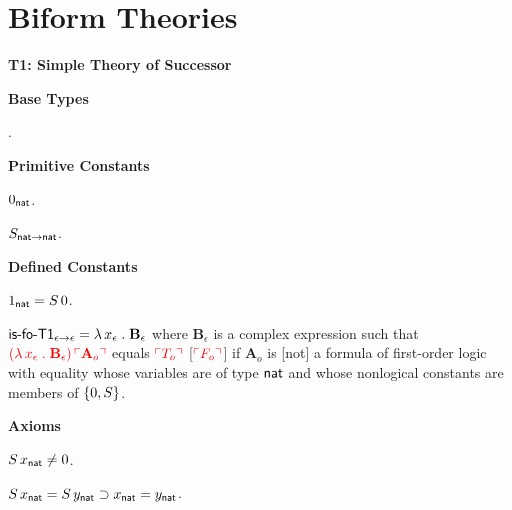 \documentclass[fleqn,11pt]{article}
\begin{document}
\ee
  

\section{Biform Theories}

\noindent
\textbf{T1: Simple Theory of Successor}

\bi

  \item[] \textbf{Base Types} 

  \be

    \item {}.

  \ee

  \item[] \textbf{Primitive Constants}

  \be

    \item $0_{\sf nat}$.

    \item $S_{{\sf nat} \rightarrow {\sf nat}}$.

  \ee

  \item[] \textbf{Defined Constants}

  \be

    \item $1_{\sf nat} = S \, 0$.

    \item $\mbox{\sf is-fo-T1}_{\epsilon \rightarrow \epsilon} = \lambda\,
      x_\epsilon \mathrel. \textbf{B}_\epsilon$ {\sglsp} where
      $\textbf{B}_\epsilon$ is a complex expression such that
      $\textcolor{red}{(\lambda\, x_\epsilon \mathrel. \textbf{B}_\epsilon) \,
      \ulcorner\textbf{A}_o\urcorner}$ equals $\textcolor{red}{\ulcorner T_o\urcorner}$
      [$\textcolor{red}{\ulcorner F_o\urcorner}$] if $\textbf{A}_o$ is [not] a formula of
      first-order logic with equality whose variables are of type
      $\mbox{\sf nat}$ and whose nonlogical constants are members of
      ${\{ 0,S \}}$.

  \ee

  \item[] \textbf{Axioms}

  \be

    \item $S \, x_{\sf nat} \not= 0$.

    \item $S \, x_{\sf nat} = S \, y_{\sf nat} \supset x_{\sf nat} =
      y_{\sf nat}$.

  \ee
\end{document}
